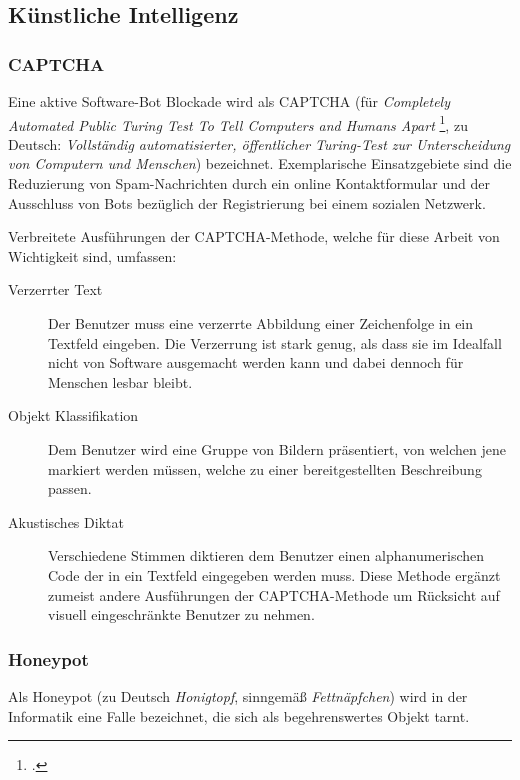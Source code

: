 \subsection{Künstliche Intelligenz} %
\label{sub:kunstliche_intelligenz}
\subsubsection{CAPTCHA} %
\label{ssub:captcha}
Eine aktive Software-Bot Blockade wird als CAPTCHA (für \emph{Completely
Automated Public Turing Test To Tell Computers and Humans Apart}
\footcite{captchaNet}, zu Deutsch: \emph{Vollständig automatisierter,
öffentlicher Turing-Test zur Unterscheidung von Computern und Menschen})
bezeichnet. Exemplarische Einsatzgebiete sind die Reduzierung von
Spam-Nachrichten durch ein online Kontaktformular und der Ausschluss von Bots
bezüglich der Registrierung bei einem sozialen Netzwerk.

Verbreitete Ausführungen der CAPTCHA-Methode, welche für diese Arbeit von
Wichtigkeit sind, umfassen:

\begin{description}
  \item[Verzerrter Text]
  Der Benutzer muss eine verzerrte Abbildung einer Zeichenfolge in ein Textfeld
  eingeben. Die Verzerrung ist stark genug, als dass sie im Idealfall nicht von
  Software ausgemacht werden kann und dabei dennoch für Menschen lesbar bleibt.
  
  \item[Objekt Klassifikation]
  Dem Benutzer wird eine Gruppe von Bildern präsentiert, von welchen jene
  markiert werden müssen, welche zu einer bereitgestellten Beschreibung passen.
  
  \item[Akustisches Diktat]
  Verschiedene Stimmen diktieren dem Benutzer einen alphanumerischen Code der
  in ein Textfeld eingegeben werden muss. Diese Methode ergänzt zumeist andere
  Ausführungen der CAPTCHA-Methode um Rücksicht auf visuell eingeschränkte
  Benutzer zu nehmen.
\end{description}

\subsubsection{Honeypot} %
\label{ssub:honeypot}
Als Honeypot (zu Deutsch \emph{Honigtopf}, sinngemäß \emph{Fettnäpfchen}) wird
in der Informatik eine Falle bezeichnet, die sich als begehrenswertes Objekt
tarnt.


